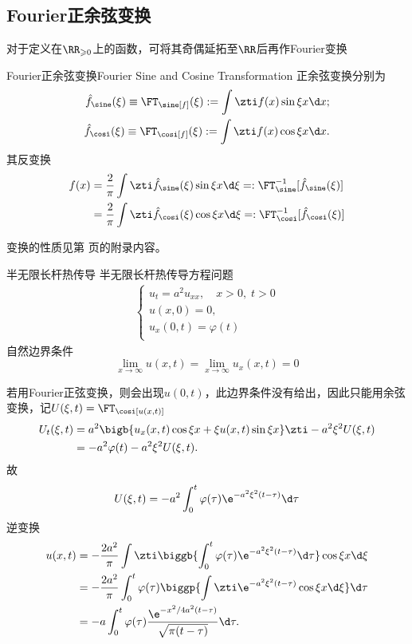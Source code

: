 \subsection{Fourier正余弦变换}
对于定义在$\RR_{\geqslant  0}$上的函数，可将其奇偶延拓至$\RR$后再作Fourier变换
\begin{definition}{Fourier正余弦变换}{Fourier Sine and Cosine Transformation}
	正余弦变换分别为
	\begin{align*}
		\hat f_\sine(\xi)\equiv\FT_\sine[f](\xi):=\int\zti f(x)\sin\xi x\d x;\\
		\hat f_\cosi(\xi)\equiv\FT_\cosi[f](\xi):=\int\zti f(x)\cos\xi x\d x.
	\end{align*}
	其反变换
	\begin{align*}
		f(x)&=\frac2\pi\int\zti\hat f_\sine(\xi)\sin\xi x\d\xi=:\FT_\sine^{-1}[\hat f_\sine(\xi)]\\
		&=\frac2\pi\int\zti\hat f_\cosi(\xi)\cos\xi x\d\xi=:\FT_\cosi^{-1}[\hat f_\cosi(\xi)]
	\end{align*}
\end{definition}
变换的性质见第 \pageref{The Property of Sine and Cosine Transformation} 页的附录内容。
\begin{example}{半无限长杆热传导}{}
	半无限长杆热传导方程问题
	\begin{align*}
		\begin{cases}
			u_t=a^2u_{xx},\quad x>0,\;t>0\\
			u(x,0)=0,\\
			u_x(0,t)=\varphi(t)\\
		\end{cases}
	\end{align*}
	自然边界条件
	\[
		\lim_{x\to\infty}u(x,t)=\lim_{x\to\infty}u_x(x,t)=0
	\]
	
	若用Fourier正弦变换，则会出现$u(0,t)$，此边界条件没有给出，因此只能用余弦变换，记$U(\xi,t)=\FT_\cosi[u(x,t)]$
	\begin{align*}
		U_t(\xi,t)&=a^2\bigb{u_x(x,t)\cos\xi x+\xi u(x,t)\sin\xi x}\zti-a^2\xi^2U(\xi,t)\\
		&=-a^2\varphi(t)-a^2\xi^2U(\xi,t).
	\end{align*}
	故
	\[
		U(\xi,t)=-a^2\int_0^t\varphi(\tau)\e^{-a^2\xi^2(t-\tau)}\d\tau
	\]
	逆变换
	\begin{align*}
		u(x,t)&=-\frac{2a^2}\pi\int\zti\biggb{\int_0^t\varphi(\tau)\e^{-a^2\xi^2(t-\tau)}\d\tau}\cos\xi x\d\xi\\
		&=-\frac{2a^2}\pi\int_0^t\varphi(\tau)\biggp{\int\zti\e^{-a^2\xi^2(t-\tau)}\cos\xi x\d\xi}\d\tau\\
		&=-a\int_0^t\varphi(\tau)\frac{\e^{-x^2/4a^2(t-\tau)}}{\sqrt{\pi(t-\tau)}}\d\tau.
	\end{align*}
\end{example}

